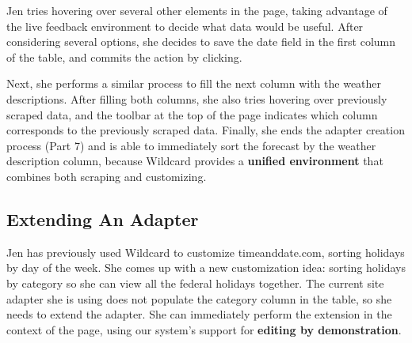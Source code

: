 \documentclass[sigconf,10pt]{acmart}
\begin{document}
Jen tries hovering over several other elements in the page, taking
advantage of the live feedback environment to decide what data would be
useful. After considering several options, she decides to save the date
field in the first column of the table, and commits the action by
clicking.

Next, she performs a similar process to fill the next column with the
weather descriptions. After filling both columns, she also tries
hovering over previously scraped data, and the toolbar at the top of the
page indicates which column corresponds to the previously scraped data.
Finally, she ends the adapter creation process (Part 7) and is able to
immediately sort the forecast by the weather description column, because
Wildcard provides a \textbf{unified environment} that combines both
scraping and customizing.

\hypertarget{extending-an-adapter}{%
\subsection{Extending An Adapter}\label{extending-an-adapter}}

Jen has previously used Wildcard to customize timeanddate.com, sorting
holidays by day of the week. She comes up with a new customization idea:
sorting holidays by category so she can view all the federal holidays
together. The current site adapter she is using does not populate the
category column in the table, so she needs to extend the adapter. She
can immediately perform the extension in the context of the page, using
our system's support for \textbf{editing by demonstration}.
\end{document}
